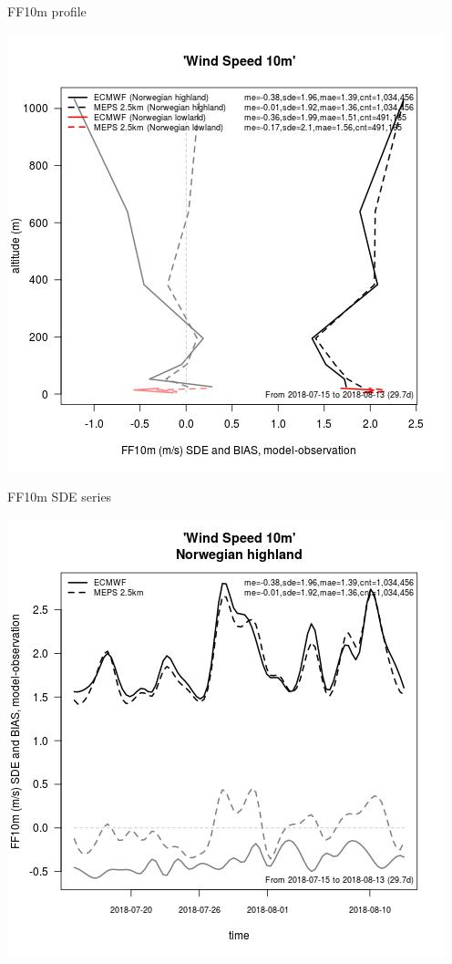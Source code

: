 \documentclass[letterpaper,10pt,twoside,twocolumn,openany]{book}
\begin{document}
{\begin{paperbox}{FF10m profile}
  \centerline{\includegraphics[width=0.75\columnwidth]{ff10m_prof.jpg}}
\end{paperbox}

\begin{paperbox}{FF10m SDE series}
  \centerline{\includegraphics[width=0.8\columnwidth]{ff10m_series_hl.jpg}}
\end{paperbox}


}
\end{document}
